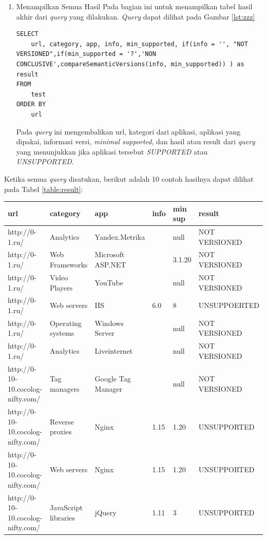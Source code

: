 \begin{enumerate}
	
	\item Menampilkan Semua Hasil
	Pada bagian ini untuk menampilkan tabel hasil akhir dari \textit{query} yang dilakukan. \textit{Query} dapat dilihat pada Gambar \ref{lst:zzz}
	\begin{lstlisting}[label={lst:zzz}, caption={Menampilkan Semua Hasil}]
SELECT 
	url, category, app, info, min_supported, if(info = '', "NOT VERSIONED",if(min_supported = '?','NON CONCLUSIVE',compareSemanticVersions(info, min_supported)) ) as  result
FROM 
	test 
ORDER BY 
	url
	\end{lstlisting}
Pada \textit{query} ini mengembalikan url, kategori dari aplikasi, aplikasi yang dipakai, informasi versi, \textit{minimal supported}, dan hasil atau result dari \textit{query} yang menunjukkan jika aplikasi tersebut \textit{SUPPORTED} atau \textit{UNSUPPORTED}.
\end{enumerate}
Ketika semua \textit{query} disatukan, berikut adalah 10 contoh hasilnya dapat dilihat pada Tabel \ref{table:result}:

\begin{adjustwidth}{-2.5 cm}{-2.5 cm}\centering\begin{threeparttable}[!htb]
		\begin{tabular}{|p{2cm}|l|l|l|l|l|}
			\hline
			\textbf{url} & \textbf{category} & \textbf{app} & \textbf{info}  & \textbf{min sup}  & \textbf{result}\\
			\hline
			http://0-1.ru/ & Analytics & Yandex.Metrika & & null & NOT VERSIONED\\
			\hline
			http://0-1.ru/ & Web Frameworks & Microsoft ASP.NET
			& & 3.1.20 & NOT VERSIONED\\
			\hline
			http://0-1.ru/ & Video Players & YouTube & & null & NOT VERSIONED\\
			\hline
			http://0-1.ru/ & Web servers & IIS & 6.0 & 8 &  UNSUPPOERTED\\
			\hline
			http://0-1.ru/ & Operating systems & Windows Server & & null & NOT VERSIONED\\
			\hline
			http://0-1.ru/ & Analytics & Liveinternet & & null & NOT VERSIONED\\
			\hline
			http://0-10-10.cocolog-nifty.com/
			& Tag managers & Google Tag Manager
			& & null & NOT VERSIONED\\
			\hline
			http://0-10-10.cocolog-nifty.com/
			& Reverse proxies
			& Nginx & 1.15 & 1.20 & UNSUPPORTED\\
			\hline
			http://0-10-10.cocolog-nifty.com/
			& Web servers & Nginx & 1.15 & 1.20 &  UNSUPPORTED\\
			\hline
			http://0-10-10.cocolog-nifty.com/
			& JavaScript libraries
			& jQuery & 1.11 & 3 & UNSUPPORTED\\
			\hline
		\end{tabular}
		\label{table:result}
\end{threeparttable}\end{adjustwidth}


